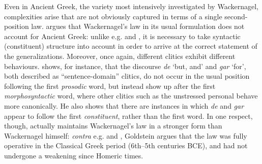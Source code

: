 \documentclass[output=paper]{../langscibook}
\begin{document}
Even in Ancient Greek, the variety most intensively investigated by Wackernagel, complexities arise that are not obviously captured in terms of a single second-position law. \citet{Taylor1990} argues that Wackernagel's law in its usual formulation does not account for Ancient Greek: unlike e.g. \citet{Dover1960} and \citet{Marshall1987}, it is necessary to take syntactic (constituent) structure into account in order to arrive at the correct statement of the generalizations. Moreover, once again, different clitics exhibit different behaviours. \citet[80--84]{Goldstein2016} shows, for instance, that the discourse  \textit{de} `but, and' and \textit{gar} `for', both described as ``sentence-domain'' clitics, do not occur in the usual position following the first \textit{prosodic} word, but instead show up after the first \textit{morphosyntactic} word, where other clitics such as the unstressed personal  behave more canonically. He also shows that there are instances in which \textit{de} and \textit{gar} appear to follow the first \textit{constituent}, rather than the first word. In one respect, though, \citet{Goldstein2016} actually maintains Wackernagel's law in a stronger form than Wackernagel himself: \textit{contra} e.g. \citet{Wackernagel1892} and \citet{Taylor1990}, Goldstein argues that the law was fully operative in the Classical Greek period (6th--5th centuries BCE), and had not undergone a weakening since Homeric times.
\end{document}
